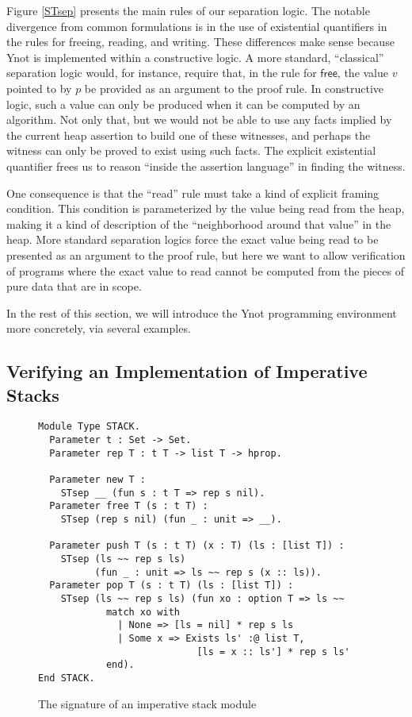 \documentclass[preprint,nocopyrightspace]{sigplanconf}
\newcommand{\coq}[1]{\mathsf{#1}}
\begin{document}
Figure \ref{STsep} presents the main rules of our separation logic.  The notable divergence from common formulations is in the use of existential quantifiers in the rules for freeing, reading, and writing.  These differences make sense because Ynot is implemented within a constructive logic.  A more standard, ``classical'' separation logic would, for instance, require that, in the rule for $\coq{free}$, the value $v$ pointed to by $p$ be provided as an argument to the proof rule.  In constructive logic, such a value can only be produced when it can be computed by an algorithm.  Not only that, but we would not be able to use any facts implied by the current heap assertion to build one of these witnesses, and perhaps the witness can only be proved to exist using such facts.  The explicit existential quantifier frees us to reason ``inside the assertion language'' in finding the witness.

One consequence is that the ``read'' rule must take a kind of explicit framing condition.  This condition is parameterized by the value being read from the heap, making it a kind of description of the ``neighborhood around that value'' in the heap.  More standard separation logics force the exact value being read to be presented as an argument to the proof rule, but here we want to allow verification of programs where the exact value to read cannot be computed from the pieces of pure data that are in scope.

\medskip

In the rest of this section, we will introduce the Ynot programming environment more concretely, via several examples.


\subsection{Verifying an Implementation of Imperative Stacks}

\begin{figure}
  \begin{verbatim}
Module Type STACK.
  Parameter t : Set -> Set.
  Parameter rep T : t T -> list T -> hprop.

  Parameter new T :
    STsep __ (fun s : t T => rep s nil).
  Parameter free T (s : t T) :
    STsep (rep s nil) (fun _ : unit => __).

  Parameter push T (s : t T) (x : T) (ls : [list T]) :
    STsep (ls ~~ rep s ls)
          (fun _ : unit => ls ~~ rep s (x :: ls)).
  Parameter pop T (s : t T) (ls : [list T]) :
    STsep (ls ~~ rep s ls) (fun xo : option T => ls ~~
            match xo with
              | None => [ls = nil] * rep s ls
              | Some x => Exists ls' :@ list T,
                            [ls = x :: ls'] * rep s ls'
            end).
End STACK.
  \end{verbatim}

  \caption{\label{Stack}The signature of an imperative stack module}
\end{figure}
\end{document}
